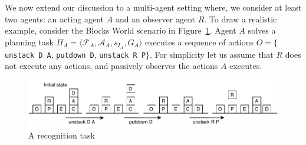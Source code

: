 We now extend our discussion to a multi-agent setting where, we consider at least two agents: an  acting agent $A$ and an observer agent $R$. To draw a realistic example, consider the Blocks World scenario in Figure~\ref{fig:bwpr}. Agent $A$ solves a planning task $\Pi_A=\langle \mathcal{F}_A, \mathcal{A}_A, s_{I_A}, G_A\rangle$ executes a sequence of actions $O=\lbrace$\texttt{unstack D A}, \texttt{putdown D}, \texttt{unstack R P}$\rbrace$. For simplicity let us assume that $R$ does not execute any actions, and passively observes the actions $A$ executes.

\begin{figure}[tpb]
  \centering
\includegraphics[width=\columnwidth]{img/bwpr.pdf}
  \caption{A recognition task}
  \label{fig:bwpr}
\end{figure}

